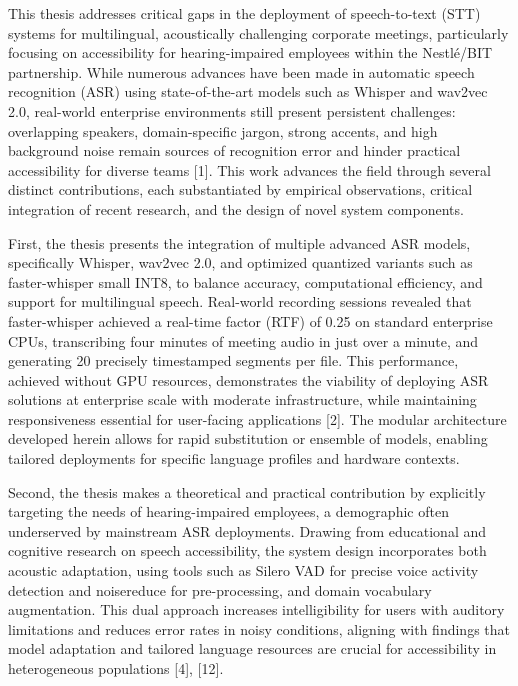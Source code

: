 \documentclass[12pt,a4paper]{article}
\begin{document}
This thesis addresses critical gaps in the deployment of speech-to-text (STT) systems for multilingual, acoustically challenging corporate meetings, particularly focusing on accessibility for hearing-impaired employees within the Nestlé/BIT partnership. While numerous advances have been made in automatic speech recognition (ASR) using state-of-the-art models such as Whisper and wav2vec 2.0, real-world enterprise environments still present persistent challenges: overlapping speakers, domain-specific jargon, strong accents, and high background noise remain sources of recognition error and hinder practical accessibility for diverse teams [1]. This work advances the field through several distinct contributions, each substantiated by empirical observations, critical integration of recent research, and the design of novel system components.


First, the thesis presents the integration of multiple advanced ASR models, specifically Whisper, wav2vec 2.0, and optimized quantized variants such as faster-whisper small INT8, to balance accuracy, computational efficiency, and support for multilingual speech. Real-world recording sessions revealed that faster-whisper achieved a real-time factor (RTF) of 0.25 on standard enterprise CPUs, transcribing four minutes of meeting audio in just over a minute, and generating 20 precisely timestamped segments per file. This performance, achieved without GPU resources, demonstrates the viability of deploying ASR solutions at enterprise scale with moderate infrastructure, while maintaining responsiveness essential for user-facing applications [2]. The modular architecture developed herein allows for rapid substitution or ensemble of models, enabling tailored deployments for specific language profiles and hardware contexts.


Second, the thesis makes a theoretical and practical contribution by explicitly targeting the needs of hearing-impaired employees, a demographic often underserved by mainstream ASR deployments. Drawing from educational and cognitive research on speech accessibility, the system design incorporates both acoustic adaptation, using tools such as Silero VAD for precise voice activity detection and noisereduce for pre-processing, and domain vocabulary augmentation. This dual approach increases intelligibility for users with auditory limitations and reduces error rates in noisy conditions, aligning with findings that model adaptation and tailored language resources are crucial for accessibility in heterogeneous populations [4], [12].
\end{document}
